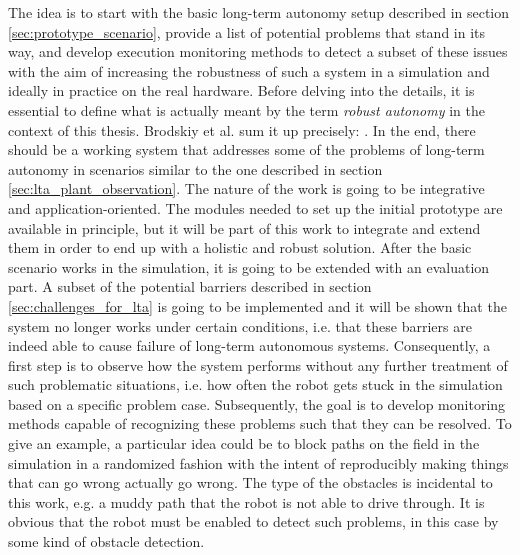 \documentclass[english, master, utf8]{base/thesis_KBS}
\begin{document}
The idea is to start with the basic long-term autonomy setup described in section \ref{sec:prototype_scenario}, provide a list of potential problems that 
stand in its way, and develop execution monitoring methods to detect a subset of these issues with the aim of increasing the robustness of such a system in a simulation
and ideally in practice on the real hardware. Before delving into the details, it is essential to define what is actually meant by the term \textit{robust autonomy} in the
context of this thesis. Brodskiy et al. sum it up precisely: . \cite{Brodskiy:2011}
In the end, there should be a working system that addresses some of the problems of long-term autonomy
in scenarios similar to the one described in section \ref{sec:lta_plant_observation}. The nature of the work is going to be integrative and application-oriented. The modules 
needed to set up the initial prototype are available in principle, but it will be part of this work to integrate and extend them in order to end up with a holistic and robust
solution. After the basic scenario works in the simulation, it is going to be extended with an evaluation part. A subset of the potential barriers described in section 
\ref{sec:challenges_for_lta} is going to be implemented and it will be shown that the system no longer works under certain conditions, i.e. that these
barriers are indeed able to cause failure of long-term autonomous systems. Consequently, a first step is to observe how the system performs without any further 
treatment of such problematic situations, i.e. how often the robot gets stuck in the simulation based on a specific problem case.
Subsequently, the goal is to develop monitoring methods capable of recognizing these problems such that they can be resolved.
To give an example, a particular idea could be to block paths on the field in the simulation in a randomized fashion with the intent of reproducibly making things that 
can go wrong actually go wrong. The type of the obstacles is incidental to this work, e.g. a muddy path that the robot is not able to drive through. 
It is obvious that the robot must be enabled to detect such problems, in this case by some kind of obstacle detection.
\end{document}
